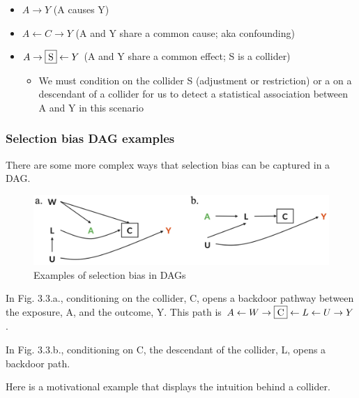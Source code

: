 \documentclass[
]{book}
\providecommand{\tightlist}{%
  \setlength{\itemsep}{0pt}\setlength{\parskip}{0pt}}
\begin{document}
\begin{itemize}
\tightlist
\item
  \(A \rightarrow Y\) (A causes Y)
\item
  \(A \leftarrow C \rightarrow Y\) (A and Y share a common cause; aka confounding)
\item
  \(A \rightarrow \fbox{S} \leftarrow Y\) (A and Y share a common effect; S is a collider)

  \begin{itemize}
  \tightlist
  \item
    We must condition on the collider S (adjustment or restriction) or a on a descendant of a collider for us to detect a statistical association between A and Y in this scenario
  \end{itemize}
\end{itemize}

\hypertarget{selection-bias-dag-examples}{%
\subsubsection{Selection bias DAG examples}\label{selection-bias-dag-examples}}

There are some more complex ways that selection bias can be captured in a DAG.

\begin{figure}

{\centering \includegraphics[width=1\linewidth]{img/selection-bias/selection_bias_examples} 

}

\caption{Examples of selection bias in DAGs}\label{fig:unnamed-chunk-14}
\end{figure}

In Fig. 3.3.a., conditioning on the collider, C, opens a backdoor pathway between the exposure, A, and the outcome, Y. This path is \(A \leftarrow W \rightarrow \fbox{C} \leftarrow L \leftarrow U \rightarrow Y\).

In Fig. 3.3.b., conditioning on C, the descendant of the collider, L, opens a backdoor path.

Here is a motivational example that displays the intuition behind a collider.
\end{document}
